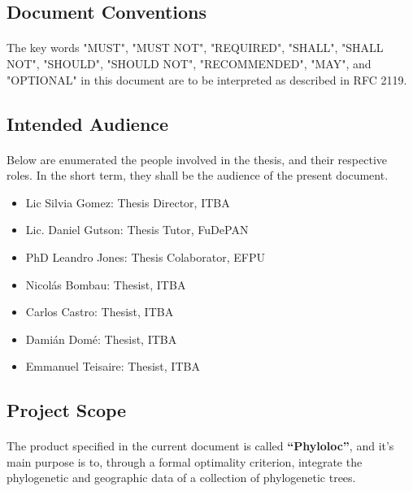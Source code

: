 \documentclass[10pt,a4paper]{article}
\begin{document}
  \subsection{Document Conventions}

\paragraph{} 
 The key words "MUST", "MUST NOT", "REQUIRED", "SHALL", "SHALL NOT", "SHOULD", "SHOULD NOT", "RECOMMENDED",  "MAY", and "OPTIONAL" in this document are to be interpreted as described in RFC 2119.

  \subsection{Intended Audience}

  \paragraph{}
Below are enumerated the people involved in the thesis, and their respective roles. In the short term, they shall be the audience of the present document.

  \begin{itemize}
    \item Lic Silvia Gomez: Thesis Director, ITBA
    \item Lic. Daniel Gutson: Thesis Tutor, FuDePAN
    \item PhD Leandro Jones: Thesis Colaborator, EFPU
    \item Nicol\'as Bombau: Thesist, ITBA
    \item Carlos Castro: Thesist, ITBA
    \item Dami\'an Dom\'e: Thesist, ITBA
    \item Emmanuel Teisaire: Thesist, ITBA
  \end{itemize}  
 
  \subsection{Project Scope}
\paragraph{}
The product specified in the current document is called \textbf{``Phyloloc''}, and it's main purpose is to, through a formal optimality criterion, integrate the phylogenetic and geographic data of a collection of phylogenetic trees. 
\end{document}

